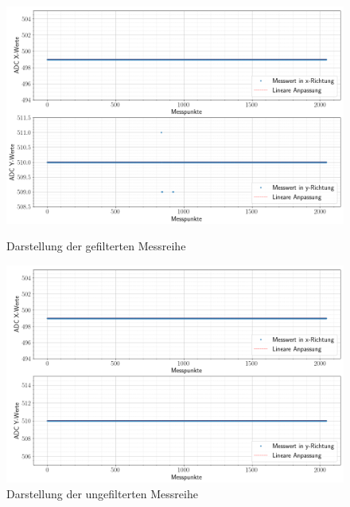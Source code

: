 \begin{figure}[ht!]
    \centering
    \includegraphics[width=\linewidth]{fig/filtered.png}
    \caption{Darstellung der gefilterten Messreihe}
    \label{fig:filtered}
    \centering
    \includegraphics[width=\linewidth]{fig/unfiltered.png}
    \caption{Darstellung der ungefilterten Messreihe}
    \label{fig:unfiltered}
\end{figure}

\newpage

